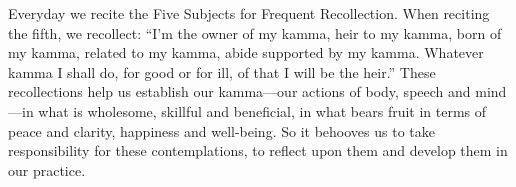 Everyday we recite the Five Subjects for Frequent Recollection. When 
reciting the fifth, we recollect: ``I'm the owner of my kamma, heir to 
my kamma, born of my kamma, related to my kamma, abide supported by my 
kamma. Whatever kamma I shall do, for good or for ill, of that I will 
be the heir.'' These recollections help us establish our kamma---our 
actions of body, speech and mind---in what is wholesome, skillful and 
beneficial, in what bears fruit in terms of peace and clarity, 
happiness and well-being. So it behooves us to take responsibility for 
these contemplations, to reflect upon them and develop them in our 
practice.

